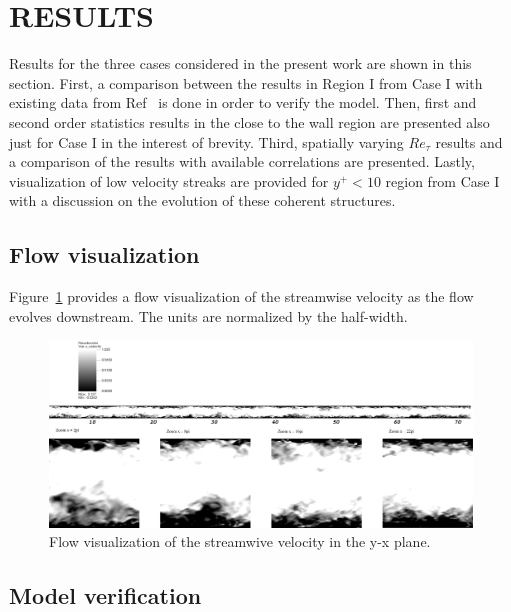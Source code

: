 \documentclass[twocolumn,10pt]{asme2e}
\begin{document}

\section*{RESULTS}

Results for the three cases considered in the present work are shown in this section. First, a comparison between the results in Region I from Case I with existing data from Ref~\cite{myoungkyu2015} is done in order to verify the model. Then, first and second order statistics results in the close to the wall region are presented also just for Case I in the interest of brevity. Third, spatially varying \(Re_{\tau}\) results and a comparison of the results with available correlations are presented. Lastly, visualization of low velocity streaks are provided for \(y^+<10\) region from Case I with a discussion on the evolution of these coherent structures.

\subsection*{Flow visualization}

Figure~\ref{fig:flow_viz} provides a flow visualization of the streamwise velocity as the flow evolves downstream. The units are normalized by the half-width.

\begin{figure}[t]
    \includegraphics[width=\textwidth]{flow_field_x_y_with_label.pdf}
    \caption{Flow visualization of the streamwive velocity in the y-x plane.}
    \label{fig:flow_viz}
\end{figure}

\subsection*{Model verification}
\end{document}
